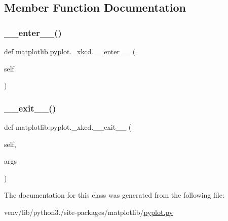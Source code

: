 \subsection{Member Function Documentation}
\mbox{\label{classmatplotlib_1_1pyplot_1_1__xkcd_a23c9ac9467f46e9b7331241d155487de}} 
\subsubsection{\texorpdfstring{\+\_\+\+\_\+enter\+\_\+\+\_\+()}{\_\_enter\_\_()}}
{\footnotesize\ttfamily def matplotlib.\+pyplot.\+\_\+xkcd.\+\_\+\+\_\+enter\+\_\+\+\_\+ (\begin{DoxyParamCaption}\item[{}]{self }\end{DoxyParamCaption})}

\mbox{\label{classmatplotlib_1_1pyplot_1_1__xkcd_a58365370303ff11b274d2ae84744da07}} 
\subsubsection{\texorpdfstring{\+\_\+\+\_\+exit\+\_\+\+\_\+()}{\_\_exit\_\_()}}
{\footnotesize\ttfamily def matplotlib.\+pyplot.\+\_\+xkcd.\+\_\+\+\_\+exit\+\_\+\+\_\+ (\begin{DoxyParamCaption}\item[{}]{self,  }\item[{}]{args }\end{DoxyParamCaption})}



The documentation for this class was generated from the following file\+:\begin{DoxyCompactItemize}
\item 
venv/lib/python3./site-\/packages/matplotlib/\hyperlink{pyplot_8py}{pyplot.\+py}\end{DoxyCompactItemize}
